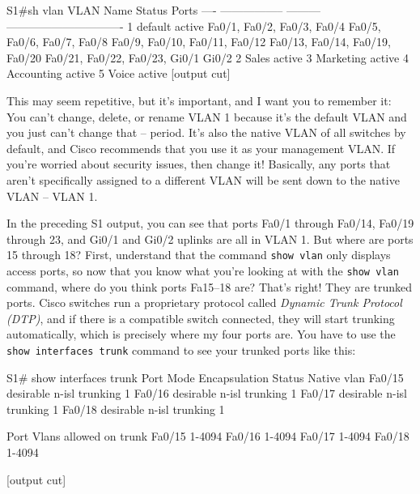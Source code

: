 \begin{cli}
S1#sh vlan
VLAN Name              Status    Ports
---- ----------------- --------- -------------------------------
1    default           active    Fa0/1, Fa0/2, Fa0/3, Fa0/4
                                 Fa0/5, Fa0/6, Fa0/7, Fa0/8
                                 Fa0/9, Fa0/10, Fa0/11, Fa0/12
                                 Fa0/13, Fa0/14, Fa0/19, Fa0/20
                                 Fa0/21, Fa0/22, Fa0/23, Gi0/1
                                 Gi0/2
2    Sales             active
3    Marketing         active
4    Accounting        active
5    Voice             active
[output cut]
\end{cli}

This may seem repetitive, but it's important, and I want you to remember
it: You can't change, delete, or rename VLAN 1 because it's the default
VLAN and you just can't change that -- period. It's also the native VLAN
of all switches by default, and Cisco recommends that you use it as your
management VLAN. If you're worried about security issues, then change
it! Basically, any ports that aren't specifically assigned to a
different VLAN will be sent down to the native VLAN -- VLAN 1.

In the preceding S1 output, you can see that ports Fa0/1 through Fa0/14,
Fa0/19 through 23, and Gi0/1 and Gi0/2 uplinks are all in VLAN 1. But
where are ports 15 through 18? First, understand that the command
\texttt{show\ vlan} only displays access ports, so now that you know
what you're looking at with the \texttt{show\ vlan} command, where do
you think ports Fa15--18 are? That's right! They are trunked ports.
Cisco switches run a proprietary protocol called \emph{Dynamic Trunk
Protocol (DTP)}, and if there is a compatible switch connected, they
will start trunking automatically, which is precisely where my four
ports are. You have to use the \texttt{show\ interfaces\ trunk} command
to see your trunked ports like this:

\begin{cli}
S1# show interfaces trunk
Port        Mode             Encapsulation  Status        Native vlan
Fa0/15      desirable        n-isl          trunking      1
Fa0/16      desirable        n-isl          trunking      1
Fa0/17      desirable        n-isl          trunking      1
Fa0/18      desirable        n-isl          trunking      1

Port        Vlans allowed on trunk
Fa0/15      1-4094
Fa0/16      1-4094
Fa0/17      1-4094
Fa0/18      1-4094

[output cut]
\end{cli}

